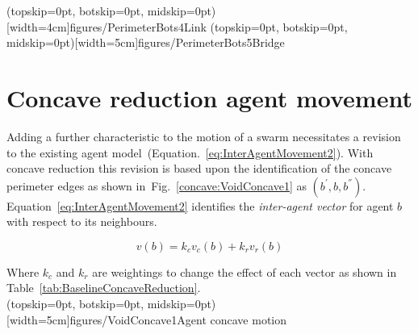 \documentclass{ieeeaccess}
\begin{document}
\Figure[t!](topskip=0pt, botskip=0pt, midskip=0pt)[width=4cm]{figures/PerimeterBots4}{Link\label{fig:Connector1}}
\Figure[t!](topskip=0pt, botskip=0pt, midskip=0pt)[width=5cm]{figures/PerimeterBots5}{Bridge\label{fig:Connector2}}

\section{Concave reduction agent movement}\label{concave:AgentMovement}
Adding a further characteristic to the motion of a swarm necessitates a revision to the existing agent model~(Equation.~\ref{eq:InterAgentMovement2}). With concave reduction this revision is based upon the identification of the concave perimeter edges as shown in~Fig.~\ref{concave:VoidConcave1} as $(b^{'},b,b^{''})$. 
Equation~\ref{eq:InterAgentMovement2} identifies the \textit{inter-agent vector} for agent $b$ with respect to its neighbours.

\begin{equation}\label{eq:InterAgentMovement2}
v(b) = k_cv_{c}(b) + k_rv_{r}(b)
\end{equation}

Where $k_c$ and $k_r$ are weightings to change the effect of each vector as shown in Table~\ref{tab:BaselineConcaveReduction}.\\

\Figure[t!](topskip=0pt, botskip=0pt, midskip=0pt)[width=5cm]{figures/VoidConcave1}{Agent concave motion\label{concave:VoidConcave1}}
\end{document}

